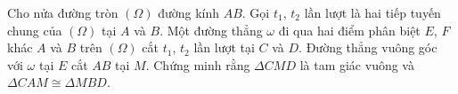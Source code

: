 \documentclass{article}
\begin{document}
Cho nửa đường tròn $\mathit{(\Omega)}$ đường kính $AB$. Gọi $t_1$, $t_2$ lần lượt là hai tiếp tuyến chung của $\mathit{(\Omega)}$ tại $A$ và $B$. Một đường thẳng $\omega$ đi qua hai điểm phân biệt $E$, $F$ khác $A$ và $B$ trên $\mathit{(\Omega)}$ cắt $t_1$, $t_2$ lần lượt tại $C$ và $D$. Đường thẳng vuông góc với $\omega$ tại $E$ cắt $AB$ tại $M$. Chứng minh rằng $\Delta CMD$ là tam giác vuông và $\Delta CAM \cong \Delta MBD$.
\end{document}
